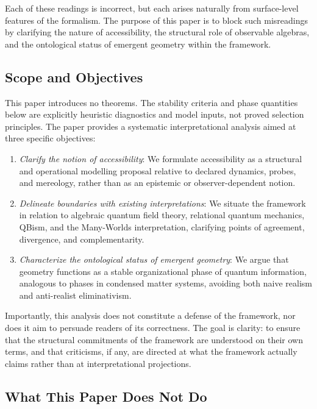 \documentclass[12pt,a4paper]{article}
\begin{document}
Each of these readings is incorrect, but each arises naturally from surface-level features of the formalism. 
The purpose of this paper is to block such misreadings by clarifying the nature of accessibility, the structural role of observable algebras, and the ontological status of emergent geometry within the framework.

\subsection{Scope and Objectives}

This paper introduces no theorems.  The stability criteria and phase quantities below are explicitly heuristic diagnostics and model inputs, not proved selection principles.  The paper provides a systematic interpretational analysis aimed at three specific objectives:

\begin{enumerate}
\item \emph{Clarify the notion of accessibility}: We formulate accessibility as a structural and operational modelling proposal relative to declared dynamics, probes, and mereology, rather than as an epistemic or observer-dependent notion.
\item \emph{Delineate boundaries with existing interpretations}: We situate the framework in relation to algebraic quantum field theory, relational quantum mechanics, QBism, and the Many-Worlds interpretation, clarifying points of agreement, divergence, and complementarity.
\item \emph{Characterize the ontological status of emergent geometry}: We argue that geometry functions as a stable organizational phase of quantum information, analogous to phases in condensed matter systems, avoiding both naive realism and anti-realist eliminativism.
\end{enumerate}

Importantly, this analysis does not constitute a defense of the framework, nor does it aim to persuade readers of its correctness. 
The goal is clarity: to ensure that the structural commitments of the framework are understood on their own terms, and that criticisms, if any, are directed at what the framework actually claims rather than at interpretational projections.

\subsection{What This Paper Does Not Do}
\end{document}

